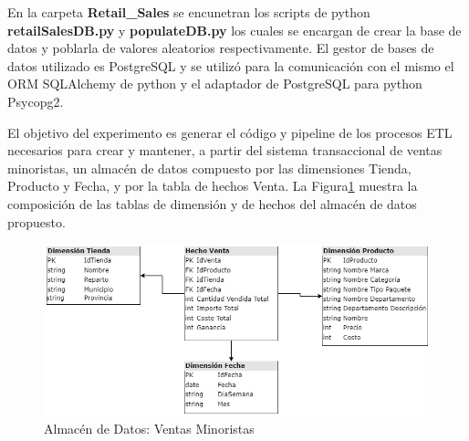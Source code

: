 En la carpeta \textbf{Retail\_Sales} se encunetran los scripts de python \textbf{retailSalesDB.py} y \textbf{populateDB.py} 
los cuales se encargan de crear la base de datos y poblarla de valores aleatorios respectivamente. El gestor de bases de 
datos utilizado es PostgreSQL y se utilizó para la comunicación con el mismo el ORM SQLAlchemy de python y el adaptador 
de PostgreSQL para python Psycopg2.

El objetivo del experimento es generar el c\'odigo y pipeline de los procesos ETL necesarios para crear y mantener,
a partir del sistema transaccional de ventas minoristas, un almacén de datos compuesto por las dimensiones Tienda, 
Producto y Fecha, y por la tabla de hechos Venta. La Figura\ref{fig:retail-Warehouse} muestra la composición de las 
tablas de dimensión y de hechos del almacén de datos propuesto.

\begin{figure}
    \centering
    \includegraphics[scale=0.5]{../document/Graphics/retailSales-Data Warehouse.jpg}
    \caption{Almacén de Datos: Ventas Minoristas}
    \label{fig:retail-Warehouse}
  \end{figure}